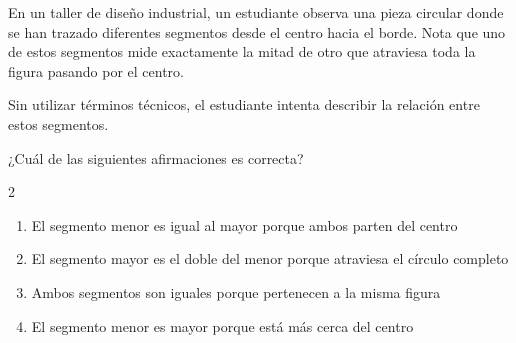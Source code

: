 En un taller de diseño industrial, un estudiante observa una pieza circular donde se han trazado diferentes segmentos desde el centro hacia el borde. Nota que uno de estos segmentos mide exactamente la mitad de otro que atraviesa toda la figura pasando por el centro.

Sin utilizar términos técnicos, el estudiante intenta describir la relación entre estos segmentos.

¿Cuál de las siguientes afirmaciones es correcta?

\begin{multicols}{2}
\begin{enumerate}[label=\alph*), leftmargin=*]
\item El segmento menor es igual al mayor porque ambos parten del centro
\item El segmento mayor es el doble del menor porque atraviesa el círculo completo
\item Ambos segmentos son iguales porque pertenecen a la misma figura
\item El segmento menor es mayor porque está más cerca del centro
\end{enumerate}
\end{multicols}